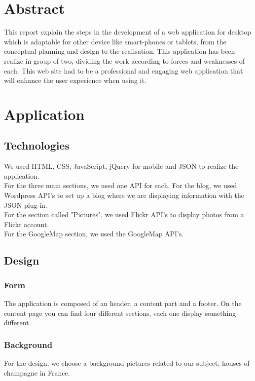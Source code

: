 \documentclass[12pt]{report}%
\begin{document}


\setcounter{page}{2}

\tableofcontents
\clearpage

\chapter{Abstract}
This report explain the steps in the development of a web application for desktop which is adaptable for other device like smart-phones or tablets, from the conceptual planning and design to the realisation. This application has been realize in group of two, dividing the work according to forces and weaknesses of each. This web site had to be a professional and engaging web application that will enhance the user
experience when using it. 

\chapter{Application}
\section{Technologies}
We used HTML, CSS, JavaScript, jQuery for mobile and JSON to realize the application.\\
For the three main sections, we used one API for each. For the blog, we used Wordpress API's to set up a blog where we are displaying information with the JSON plug-in.\\
For the section called "Pictures", we used Flickr API's to display photos from a Flickr account.\\
For the GoogleMap section, we used the GoogleMap API's.
\section{Design}
\subsection{Form}
The application is composed of an header, a content part and a footer. On the content page you can find four different sections, each one display something different.
\subsection{Background}
For the design, we choose a background pictures related to our subject, houses of champagne in France.\\
\end{document}
